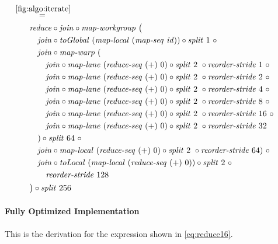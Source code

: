 \begin{align*}
%
  &\hspace{-2em}\quad\begin{aligned}
    &\overset{\ref{fig:algo:iterate}}{=\hspace{.2em}}\\
    &\qquad
      \reduce \circ \join \circ \mapWorkgroup\ \big(\\
    &\qquad\quad \join \circ \toGlobal\ (\mapLocal\ (\mapSeq\ \id)) \circ \splitN\ 1\ \circ\\
    &\qquad\quad \join \circ \mapWarp\ (\\
    &\qquad\qquad \join \circ \mapLane\ (\reduceSeq\ (+)\ 0) \circ \splitN\ 2\ \circ \reorderStride\ 1\ \circ\\
    &\qquad\qquad \join \circ \mapLane\ (\reduceSeq\ (+)\ 0) \circ \splitN\ 2\ \circ \reorderStride\ 2\ \circ\\
    &\qquad\qquad \join \circ \mapLane\ (\reduceSeq\ (+)\ 0) \circ \splitN\ 2\ \circ \reorderStride\ 4\ \circ\\
    &\qquad\qquad \join \circ \mapLane\ (\reduceSeq\ (+)\ 0) \circ \splitN\ 2\ \circ \reorderStride\ 8\ \circ\\
    &\qquad\qquad \join \circ \mapLane\ (\reduceSeq\ (+)\ 0) \circ \splitN\ 2\ \circ \reorderStride\ 16\ \circ\\
    &\qquad\qquad \join \circ \mapLane\ (\reduceSeq\ (+)\ 0) \circ \splitN\ 2\ \circ \reorderStride\ 32\\
    &\qquad\quad) \circ \splitN\ 64\ \circ\\
    &\qquad\quad  \join \circ \mapLocal\ (\reduceSeq\ (+)\ 0) \circ \splitN\ 2\ \circ \reorderStride\ 64)\ \circ\\
    &\qquad\quad \join \circ \toLocal\ (\mapLocal\ (\reduceSeq\ (+)\ 0)) \circ \splitN\ 2\ \circ\\
    &\qquad\qquad \reorderStride\ 128\\
    &\qquad\big) \circ \splitN\ 256
  \end{aligned}
%  
\end{align*}

\normalsize


\paragraph{Fully Optimized Implementation}
This is the derivation for the expression shown in \autoref{eq:reduce16}.

\small

